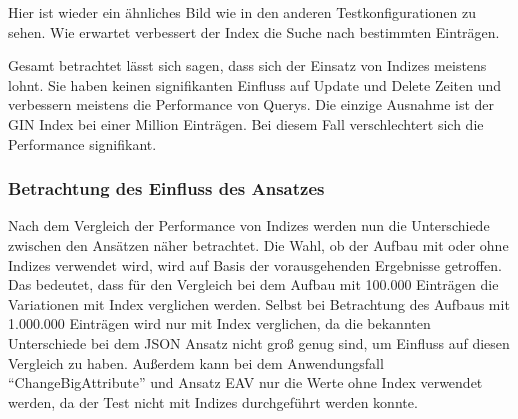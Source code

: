 Hier ist wieder ein ähnliches Bild wie in den anderen Testkonfigurationen zu sehen. Wie erwartet verbessert der Index die Suche nach bestimmten Einträgen.

Gesamt betrachtet lässt sich sagen, dass sich der Einsatz von Indizes meistens lohnt. Sie haben keinen signifikanten Einfluss auf Update und Delete Zeiten und verbessern meistens die Performance von Querys. Die einzige Ausnahme ist der \ac{GIN} Index bei einer Million Einträgen. Bei diesem Fall verschlechtert sich die Performance signifikant.

\begin{table}[h]
\caption{P-Werte des Mann-Whitney-U-Test mit zweiseitiger Alternativhypothese für den Vergleich zwischen mit und ohne Index(gerundet auf 3 signifikante Stellen)}
\centering
{}
\label{tab:mwIndexes}
\end{table}

\subsubsection*{Betrachtung des Einfluss des Ansatzes}

Nach dem Vergleich der Performance von Indizes werden nun die Unterschiede zwischen den Ansätzen näher betrachtet. Die Wahl, ob der Aufbau mit oder ohne Indizes verwendet wird, wird auf Basis der vorausgehenden Ergebnisse getroffen. Das bedeutet, dass für den Vergleich bei dem Aufbau mit 100.000 Einträgen die Variationen mit Index verglichen werden. Selbst bei Betrachtung des Aufbaus mit 1.000.000 Einträgen wird nur mit Index verglichen, da die bekannten Unterschiede bei dem JSON Ansatz nicht groß genug sind, um Einfluss auf diesen Vergleich zu haben. Außerdem kann bei dem Anwendungsfall ``ChangeBigAttribute'' und Ansatz EAV nur die Werte ohne Index verwendet werden, da der Test nicht mit Indizes durchgeführt werden konnte.


